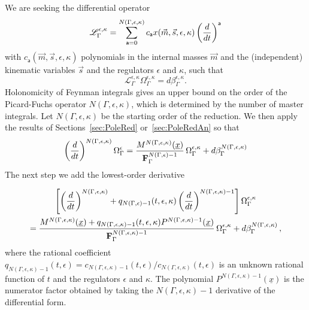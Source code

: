 \documentclass[a4paper,12pt]{article}
\numberwithin{equation}{section}
\numberwithin{figure}{section}
\begin{document}
We are seeking the differential operator 
\begin{equation}\label{e:PFgeneric}
  \mathscr{L}_\Gamma^{\epsilon,\kappa}=\sum_{\mathsf{a}=0}^{N(\Gamma,\epsilon,\kappa)}
  c_{\mathsf{a}}x(\vec m,\vec s,\epsilon,\kappa) \left(d\over dt\right)^{\mathsf{a}}
\end{equation}
with $c_{\mathsf{a}}(\vec m,\vec s,\epsilon,\kappa)$ polynomials in the internal masses
$\vec m$  and the (independent) kinematic variables $\vec s$  and the
regulators $\epsilon$  and $\kappa$, such that
\begin{equation}
     \mathscr{L}_\Gamma^{\epsilon,\kappa} \Omega_\Gamma^{\epsilon,\kappa}= d\beta^{\epsilon,\kappa}_\Gamma.
   \end{equation}
%
Holonomicity of Feynman integrals gives an upper bound on the order of the Picard-Fuchs operator $N(\Gamma,\epsilon,\kappa)$, which is  determined by
 the number of master
integrals. Let $N(\Gamma,\epsilon,\kappa)$  be the starting order of the
reduction.  We then apply the results of Sections~\ref{sec:PoleRed}
or~\ref{sec:PoleRedAn} so that
%
\begin{equation}\label{e:step1}
\left(d\over dt\right)^{N(\Gamma,\epsilon,\kappa)} \Omega_\Gamma^\epsilon= {M^{
      N(\Gamma,\epsilon,\kappa)}(\underline x)\over
    \textbf{F}_\Gamma^{N(\Gamma,\epsilon)-1}
  } \,\Omega_\Gamma^{\epsilon,\kappa}+ d\beta_\Gamma^{N(\Gamma,\epsilon,\kappa)}  
\end{equation}
%
The next step we add the lowest-order derivative

\begin{multline}\label{e:step2}
\left[\left(d\over dt\right)^{N(\Gamma,\epsilon,\kappa)}
  +q_{N(\Gamma,\epsilon)-1}(t,\epsilon,\kappa) \left(d\over dt\right)^{N(\Gamma,\epsilon,\kappa)-1}\right] \Omega_\Gamma^{\epsilon,\kappa}\cr= {M^{
      N(\Gamma,\epsilon,\kappa)}(\underline x)+q_{N(\Gamma,\epsilon,\kappa)-1}(t,\epsilon,\kappa)
    P^{N(\Gamma,\epsilon,\kappa)-1}(\underline x) \over
    \textbf{F}_\Gamma^{N(\Gamma,\epsilon,\kappa)-1}
  }\,\Omega_\Gamma^{\epsilon,\kappa}+ d\beta_\Gamma^{N(\Gamma,\epsilon,\kappa)}\, ,  
\end{multline}
where the rational coefficient
$q_{N(\Gamma,\epsilon,\kappa)-1}(t,\epsilon)=c_{N(\Gamma,\epsilon,\kappa)-1}(t,\epsilon)/c_{N(\Gamma,\epsilon,\kappa)}(t,\epsilon)$
is an unknown rational function of $t$ and  the regulators $\epsilon$
and $\kappa$. 
The polynomial $ P^{N(\Gamma,\epsilon,\kappa)-1}(\underline x) $
is the numerator factor obtained by taking the $N(\Gamma,\epsilon,\kappa)-1$
derivative of the differential form.
\end{document}
